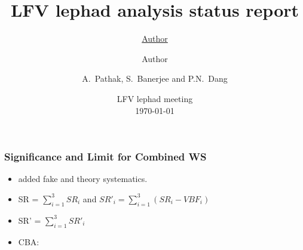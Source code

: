 \documentclass{beamer}
\title{LFV lephad analysis status report} %
\author{\underline{Author} \and Author} %
\author{A.~Pathak, S.~Banerjee and P.N.~Dang}
\institute[U. Louisville] %
\date{{LFV lephad meeting}\\\today\\} %
\begin{document}
\begin{frame}
\titlepage %
\end{frame}
\begin{frame}
\frametitle{Significance and Limit for Combined WS}
\begin {itemize}
\item added fake and theory systematics.
\item SR = $\sum_{i=1}^{3}SR_{i}$ and $SR'_{i} = \sum_{i=1}^{3}(SR_{i}-VBF_{i})$
\item SR' = $\sum_{i=1}^{3}SR'_{i}$
\end {itemize}
\vspace*{0.5cm}
\begin {itemize}
\item CBA:
\end {itemize}
\vspace*{-1.0cm}
\hspace*{-2.0cm}
\begin{table}
{}
\end{table}
\end{frame}
\end{document}
